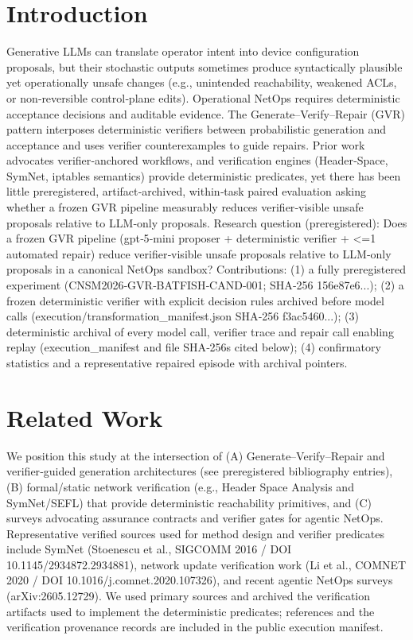 \documentclass[conference]{IEEEtran}
\begin{document}
\section{Introduction}
Generative LLMs can translate operator intent into device configuration proposals, but their stochastic outputs sometimes produce syntactically plausible yet operationally unsafe changes (e.g., unintended reachability, weakened ACLs, or non‑reversible control‑plane edits). Operational NetOps requires deterministic acceptance decisions and auditable evidence. The Generate--Verify--Repair (GVR) pattern interposes deterministic verifiers between probabilistic generation and acceptance and uses verifier counterexamples to guide repairs. Prior work advocates verifier‑anchored workflows, and verification engines (Header‑Space, SymNet, iptables semantics) provide deterministic predicates, yet there has been little preregistered, artifact‑archived, within‑task paired evaluation asking whether a frozen GVR pipeline measurably reduces verifier‑visible unsafe proposals relative to LLM‑only proposals. Research question (preregistered): Does a frozen GVR pipeline (gpt‑5‑mini proposer + deterministic verifier + <=1 automated repair) reduce verifier‑visible unsafe proposals relative to LLM‑only proposals in a canonical NetOps sandbox? Contributions: (1) a fully preregistered experiment (CNSM2026‑GVR‑BATFISH‑CAND‑001; SHA‑256 156e87e6...); (2) a frozen deterministic verifier with explicit decision rules archived before model calls (execution/transformation\_manifest.json SHA‑256 f3ac5460...); (3) deterministic archival of every model call, verifier trace and repair call enabling replay (execution\_manifest and file SHA‑256s cited below); (4) confirmatory statistics and a representative repaired episode with archival pointers.

\section{Related Work}
We position this study at the intersection of (A) Generate--Verify--Repair and verifier‑guided generation architectures (see preregistered bibliography entries), (B) formal/static network verification (e.g., Header Space Analysis and SymNet/SEFL) that provide deterministic reachability primitives, and (C) surveys advocating assurance contracts and verifier gates for agentic NetOps. Representative verified sources used for method design and verifier predicates include SymNet (Stoenescu et al., SIGCOMM 2016 / DOI 10.1145/2934872.2934881), network update verification work (Li et al., COMNET 2020 / DOI 10.1016/j.comnet.2020.107326), and recent agentic NetOps surveys (arXiv:2605.12729). We used primary sources and archived the verification artifacts used to implement the deterministic predicates; references and the verification provenance records are included in the public execution manifest.
\end{document}
